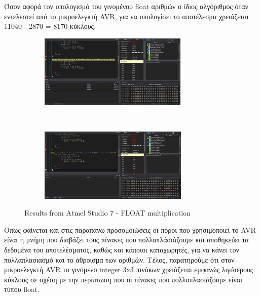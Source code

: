 \documentclass{article}
\begin{document}
	\noindent
	Όσον αφορά τον υπολογισμό του γινομένου float αριθμών ο ίδιος αλγόριθμος όταν εντελεστεί από το μικροελεγκτή AVR, για να υπολογίσει το αποτέλεσμα χρειάζεται 11040 - 2870 = 8170 κύκλους.\\
	\begin{figure}[h!]
		\centering
		\begin{subfigure}[t]{0.5\textwidth}
			\centering
			\includegraphics[height=3.5cm, width=\linewidth]{./results/lab10_sim_floats_a.png}
		\end{subfigure}%
		~
		\begin{subfigure}[t]{0.5\textwidth}
			\centering
			\includegraphics[height=3.5cm, width=\linewidth]{./results/lab10_sim_floats_b.png}
		\end{subfigure}
		\caption{Results from Αtmel Studio 7 - FLOAT multiplication}
	\end{figure}

	\noindent
	Όπως φαίνεται και στις παραπάνω προσομοιώσεις οι πόροι που χρησιμοποιεί το AVR είναι η μνήμη που διαβάζει τους πίνακες που πολλαπλάσιάζουμε και αποθηκεύει τα δεδομένα του αποτελέσματος, καθώς και κάποιοι καταχωρητές, για να κάνει τον πολλαπλασιασμό και το άθροισμα των αριθμών. Τέλος, παρατηρούμε ότι στον μικροελεγκτή AVR το γινόμενο integer 3x3 πινάκων χρειάζεται εμφανώς λιγότερους κύκλους σε σχέση με την περίπτωση που οι πίνακες που πολλαπλασιάζουμε είναι τύπου float. 
\end{document}
